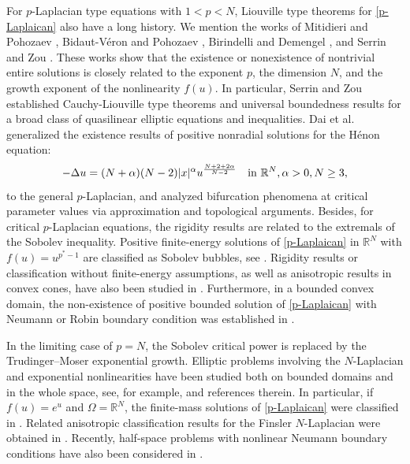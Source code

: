 \documentclass[reqno, 11pt]{amsart} %
\numberwithin{equation}{section}
\theoremstyle{definition}
\newcommand{\R}{\mathbb{R}}
\begin{document}
For $p$-Laplacian type equations with $1<p<N$, Liouville type theorems for \eqref{p-Laplaican} also have a long history. We mention the works of Mitidieri and Pohozaev \cite{MP1999,MP2001}, Bidaut-V\'{e}ron and Pohozaev \cite{BP2001}, Birindelli and Demengel \cite{BD2002}, and Serrin and Zou \cite{SZ2002}. These works show that the existence or nonexistence of nontrivial entire solutions is closely related to the exponent $p$, the dimension $N$, and the growth exponent of the nonlinearity $f(u)$. In particular, Serrin and Zou \cite{SZ2002} established Cauchy-Liouville type theorems and universal boundedness results for a broad class of quasilinear elliptic equations and inequalities. Dai et al. \cite{DDGL2026} generalized the existence results of positive nonradial solutions for the H\'{e}non equation:
 $$-\Delta u=(N+\alpha)(N-2)|x|^\alpha u^{\frac{N+2+2\alpha}{N-2}} \quad \hbox{in } \mathbb{R}^N, \alpha>0, N\geq 3,$$
 to the general $p$-Laplacian, and analyzed bifurcation phenomena at critical parameter values via approximation and topological arguments. Besides, for critical $p$-Laplacian equations, the rigidity  results are related to the extremals of the Sobolev inequality. Positive finite-energy solutions of \eqref{p-Laplaican} in $\R^N$ with $f(u) = u^{p^* -1}$ are classified as Sobolev bubbles, see \cite{DMMS2014, V2016, S2016}. Rigidity  results or classification without finite-energy assumptions, as well as anisotropic results in convex cones, have also been studied in \cite{CMR2023, O2025, CFR2020}. Furthermore, in a bounded convex domain, the non-existence of positive bounded solution of \eqref{p-Laplaican} with Neumann or Robin boundary condition was established in \cite{CCR2021}.

In the limiting case of $p=N$, the Sobolev critical power is replaced by the Trudinger--Moser exponential growth. Elliptic problems involving the $N$-Laplacian and exponential nonlinearities have been studied both on bounded domains and in the whole space, see, for example, \cite{A1990, do1996, SS1999, LL2012, deF2022} and references therein. In particular, if $f(u) = e^u$ and $\Omega = \R^N$, the finite-mass solutions of \eqref{p-Laplaican} were classified in
\cite{E2018}. Related anisotropic classification results for the Finsler $N$-Laplacian were obtained in \cite{CL2024}. Recently, half-space problems with nonlinear Neumann boundary conditions have also been considered in \cite{DGHP2026}.
\end{document}
